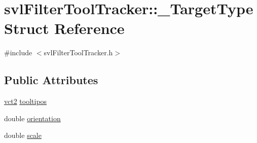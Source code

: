 \hypertarget{structsvl_filter_tool_tracker_1_1___target_type}{\section{svl\-Filter\-Tool\-Tracker\-:\-:\-\_\-\-Target\-Type Struct Reference}
\label{structsvl_filter_tool_tracker_1_1___target_type}
}


{\ttfamily \#include $<$svl\-Filter\-Tool\-Tracker.\-h$>$}

\subsection*{Public Attributes}
\begin{DoxyCompactItemize}
\item 
\hyperlink{vct_fixed_size_vector_types_8h_a88481ac3c794867ba5e4e92624f0d958}{vct2} \hyperlink{structsvl_filter_tool_tracker_1_1___target_type_a66b5c46a3d281d97a8394b62afce58d1}{tooltipos}
\item 
double \hyperlink{structsvl_filter_tool_tracker_1_1___target_type_a8a69c9b0f6d7a51e35c0b9298786bfa0}{orientation}
\item 
double \hyperlink{structsvl_filter_tool_tracker_1_1___target_type_a41580992baafb3f771b25c8c7d133477}{scale}
\end{DoxyCompactItemize}



